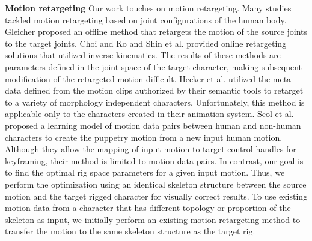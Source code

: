 \textbf{Motion retargeting}
Our work touches on motion retargeting. 
Many studies tackled motion retargeting based on joint configurations of the human body. Gleicher proposed an offline method that retargets the motion of the source joints to the target joints. 
Choi and Ko and Shin et al. provided online retargeting solutions that utilized inverse kinematics. 
The results of these methods are parameters defined in the joint space of the target character, making subsequent modification of the retargeted motion difficult. 
Hecker et al. utilized the meta data defined from the motion clips authorized by their semantic tools to retarget to a variety of morphology independent characters. 
Unfortunately, this method is applicable only to the characters created in their animation system. 
Seol et al. proposed a learning model of motion data pairs between human and non-human characters to create the puppetry motion from a new input human motion. 
Although they allow the mapping of input motion to target control handles for keyframing, their method is limited to motion data pairs. 
In contrast, our goal is to find the optimal rig space parameters for a given input motion. 
Thus, we perform the optimization using an identical skeleton structure between the source motion and the target rigged character for visually correct results. 
To use existing motion data from a character that has different topology or proportion of the skeleton as input, we initially perform an existing motion retargeting method\cite{palamar2013mastering} to transfer the motion to the same skeleton structure as the target rig.


